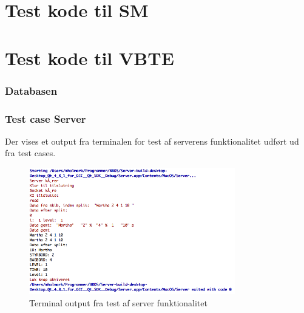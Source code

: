 \section{Test kode til SM}
\texttt{}
\section{Test kode til VBTE}

\texttt{}

\subsubsection{Databasen}
\subsubsection{Test case Server}
Der vises et output fra terminalen for test af serverens funktionalitet udført ud fra test cases.
\begin{figure}[H]
\centering
\includegraphics[width = 0.8\textwidth]{billeder/server_test}
\caption{Terminal output fra test af server funktionalitet}
\label{fig:server_test}
\end{figure}

